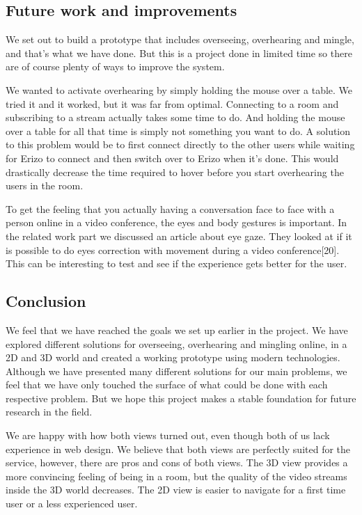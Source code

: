 \documentclass[12pt, titlepage]{article}
\begin{document}
\subsection{Future work and improvements}
We set out to build a prototype that includes overseeing, overhearing and mingle, and that's what we have done. But this is a project done in limited time so there are of course plenty of ways to improve the system.

We wanted to activate overhearing by simply holding the mouse over a table. We tried it and it worked, but it was far from optimal. Connecting to a room and subscribing to a stream actually takes some time to do. And holding the mouse over a table for all that time is simply not something you want to do. A solution to this problem would be to first connect directly to the other users while waiting for Erizo to connect and then switch over to Erizo when it's done. This would drastically decrease the time required to hover before you start overhearing the users in the room.

To get the feeling that you actually having a conversation face to face with a person online in a video conference, the eyes and body gestures is important. In the related work part we discussed an article about eye gaze. They looked at if it is possible to do eyes correction with movement during a video conference[20]. This can be interesting to test and see if the experience gets better for the user.
\subsection{Conclusion}
We feel that we have reached the goals we set up earlier in the project. We have explored different solutions for overseeing, overhearing and mingling online, in a 2D and 3D world and created a working prototype using modern technologies. Although we have presented many different solutions for our main problems, we feel that we have only touched the surface of what could be done with each respective problem. But we hope this project makes a stable foundation for future research in the field.

We are happy with how both views turned out, even though both of us lack experience in web design. We believe that both views are perfectly suited for the service, however, there are pros and cons of both views. The 3D view provides a more convincing feeling of being in a room, but the quality of the video streams inside the 3D world decreases. The 2D view is easier to navigate for a first time user or a less experienced user. 
\end{document}
